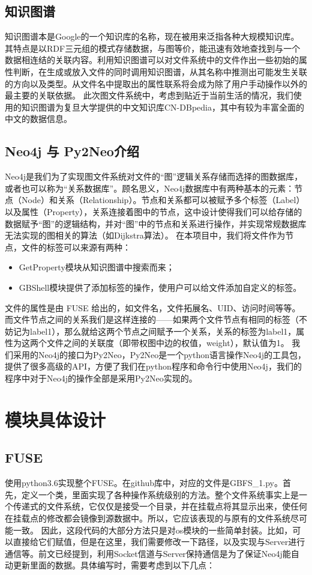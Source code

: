 \documentclass[UTF8]{ctexart}
\begin{document}
\subsection{知识图谱}
知识图谱本是Google的一个知识库的名称，现在被⽤来泛指各种⼤规模知识库。其特点是以RDF三元组的模式存储数据，与图等价，能迅速有效地查找到与一个数据相连结的关联内容。利用知识图谱可以对文件系统中的文件作出一些初始的属性判断，在生成或放入文件的同时调用知识图谱，从其名称中推测出可能发生关联的方向以及类型。从文件名中提取出的属性联系将会成为除了用户手动操作以外的最主要的关联依据。
此次图文件系统中，考虑到贴近于当前生活的情况，我们使用的知识图谱为复旦大学提供的中文知识库CN-DBpedia，其中有较为丰富全面的中文的数据信息。

\subsection{Neo4j 与 Py2Neo介绍}
Neo4j是我们为了实现图文件系统对文件的“图”逻辑关系存储而选择的图数据库，或者也可以称为“关系数据库”。顾名思义，Neo4j数据库中有两种基本的元素：节点（Node）和关系（Relationship）。节点和关系都可以被赋予多个标签（Label）以及属性（Property），关系连接着图中的节点，这中设计使得我们可以给存储的数据赋予“图”的逻辑结构，并对“图”中的节点和关系进行操作，并实现常规数据库无法实现的图相关的算法（如Dijkstra算法）。
在本项目中，我们将文件作为节点，文件的标签可以来源有两种：
\begin{itemize}
	\item GetProperty模块从知识图谱中搜索而来；
	\item GBShell模块提供了添加标签的操作，使用户可以给文件添加自定义的标签。
\end{itemize}
文件的属性是由 FUSE 给出的，如文件名，文件拓展名、UID、访问时间等等。
而文件节点之间的关系我们是这样连接的——如果两个文件节点有相同的标签（不妨记为label1），那么就给这两个节点之间赋予一个关系，关系的标签为label1，属性为这两个文件之间的关联度（即带权图中边的权值，weight），默认值为1。
我们采用的Neo4j的接口为Py2Neo，Py2Neo是一个python语言操作Neo4j的工具包，提供了很多高级的API，方便了我们在python程序和命令行中使用Neo4j，我们的程序中对于Neo4j的操作全部是采用Py2Neo实现的。

\section{模块具体设计}
\subsection{FUSE}
使用python3.6实现整个FUSE。在github库中，对应的文件是GBFS\_1.py。首先，定义一个类，里面实现了各种操作系统级别的方法。整个文件系统事实上是一个传递式的文件系统，它仅仅是接受一个目录，并在挂载点将其显示出来，使任何在挂载点的修改都会镜像到源数据中。所以，它应该表现的与原有的文件系统尽可能一致。
因此，这段代码的大部分方法只是对os模块的一些简单封装。比如，可以直接给它们赋值，但是在这里，我们需要修改一下路径，以及实现与Server进行通信等。前文已经提到，利用Socket信道与Server保持通信是为了保证Neo4j能自动更新里面的数据。具体编写时，需要考虑到以下几点：
\end{document}
